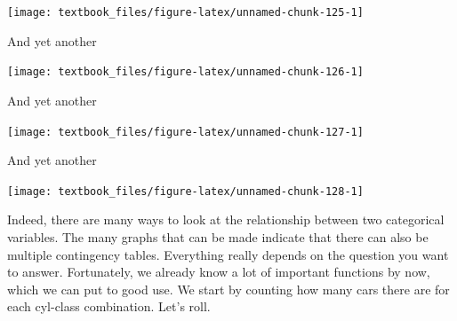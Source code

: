 \documentclass[]{tufte-book}
\newenvironment{Shaded}{}{}
\newcommand{\DataTypeTok}[1]{\textcolor[rgb]{0.56,0.13,0.00}{#1}}
\newcommand{\KeywordTok}[1]{\textcolor[rgb]{0.00,0.44,0.13}{\textbf{#1}}}
\newcommand{\NormalTok}[1]{#1}
\newcommand{\OperatorTok}[1]{\textcolor[rgb]{0.40,0.40,0.40}{#1}}
\newcommand{\StringTok}[1]{\textcolor[rgb]{0.25,0.44,0.63}{#1}}
\begin{document}
\texttt{[image: textbook\_files/figure-latex/unnamed-chunk-125-1]}

And yet another

\begin{Shaded}
\end{Shaded}

\texttt{[image: textbook\_files/figure-latex/unnamed-chunk-126-1]}

And yet another

\begin{Shaded}
\end{Shaded}

\texttt{[image: textbook\_files/figure-latex/unnamed-chunk-127-1]}

And yet another

\begin{Shaded}
\end{Shaded}

\texttt{[image: textbook\_files/figure-latex/unnamed-chunk-128-1]}

Indeed, there are many ways to look at the relationship between two categorical variables. The many graphs that can be made indicate that there can also be multiple contingency tables. Everything really depends on the question you want to answer. Fortunately, we already know a lot of important functions by now, which we can put to good use. We start by counting how many cars there are for each cyl-class combination. Let's roll.
\end{document}
